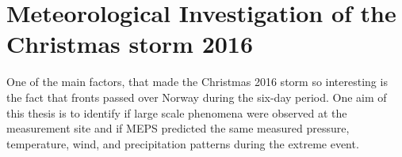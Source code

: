 \section{Meteorological Investigation of the Christmas storm 2016}
One of the main factors, that made the Christmas 2016 storm so interesting is the fact that fronts passed over Norway during the six-day period. One aim of this thesis is to identify if large scale phenomena were observed at the measurement site and if MEPS predicted the same measured pressure, temperature, wind, and precipitation patterns during the extreme event. 
